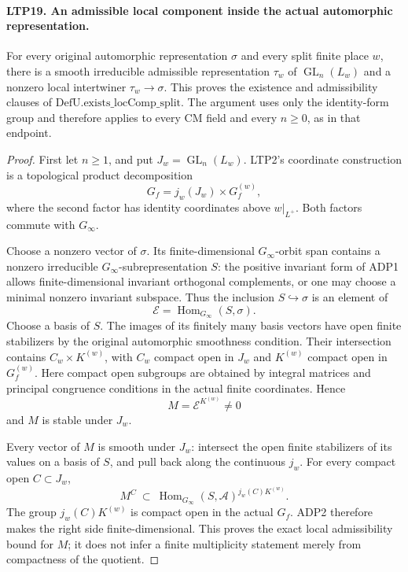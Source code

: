\documentclass[11pt,a4paper]{article}
\numberwithin{equation}{section}
\theoremstyle{remark}\newtheorem{remark}[theorem]{Remark}
\begin{document}
\paragraph{LTP19. An admissible local component inside the actual automorphic representation.}
\label{claim:LTP19}
For every original automorphic representation \(\sigma\) and
every split finite place \(w\), there is a smooth irreducible
admissible representation \(\tau_w\) of
\(\operatorname{GL}_n(L_w)\) and a nonzero local intertwiner
\(\tau_w\to\sigma\).  This proves the existence and admissibility
clauses of \(\mathrm{DefU.exists\_\allowbreak locComp\_\allowbreak split}\).
The argument uses only the identity-form group and therefore
applies to every CM field and every \(n\ge0\), as in that endpoint.
\begin{proof}
First let \(n\ge1\), and put \(J_w=\operatorname{GL}_n(L_w)\).
LTP2's coordinate construction is a topological product
decomposition
\[
                    G_f=j_w(J_w)\times G_f^{(w)} ,
\]
where the second factor has identity coordinates above
\(w|_{L^+}\).  Both factors commute with \(G_\infty\).

Choose a nonzero vector of \(\sigma\).  Its finite-dimensional
\(G_\infty\)-orbit span contains a nonzero irreducible
\(G_\infty\)-subrepresentation \(S\): the positive invariant form
of ADP1 allows finite-dimensional invariant orthogonal
complements, or one may choose a minimal nonzero invariant
subspace.  Thus the inclusion \(S\hookrightarrow\sigma\) is
an element of
\[
                \mathcal E=\operatorname{Hom}_{G_\infty}(S,\sigma).
\]
Choose a basis of \(S\).  The images of its finitely many basis
vectors have open finite stabilizers by the original automorphic
smoothness condition.  Their intersection contains
\(C_w\times K^{(w)}\), with \(C_w\) compact open in \(J_w\)
and \(K^{(w)}\) compact open in \(G_f^{(w)}\).
Here compact open subgroups are obtained by integral matrices
and principal congruence conditions in the actual finite
coordinates.  Hence
\[
                       M=\mathcal E^{K^{(w)}}\ne0
\]
and \(M\) is stable under \(J_w\).

Every vector of \(M\) is smooth under \(J_w\): intersect the
open finite stabilizers of its values on a basis of \(S\), and
pull back along the continuous \(j_w\).
For every compact open \(C\subset J_w\),
\[
    M^C\ \subset\
       \operatorname{Hom}_{G_\infty}(S,\mathcal A)^{
                                      j_w(C)K^{(w)}} .
\]
The group \(j_w(C)K^{(w)}\) is compact open in the actual \(G_f\).
ADP2 therefore makes the right side finite-dimensional.
This proves the exact local admissibility bound for \(M\);
it does not infer a finite multiplicity statement merely from
compactness of the quotient.


\end{proof}
\end{document}
